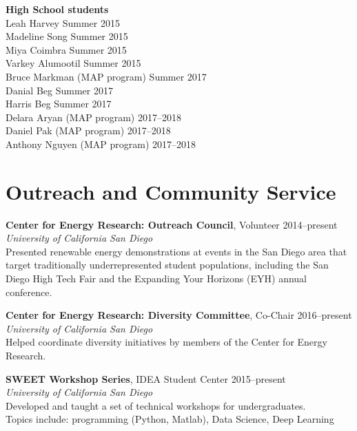 \documentclass[10pt]{res}
\begin{document}
\begin{resume}
\textbf{High School students} \\
Leah Harvey \hfill Summer 2015 \\
Madeline Song \hfill Summer 2015 \\
Miya Coimbra \hfill Summer 2015 \\
Varkey Alumootil \hfill Summer 2015 \\
Bruce Markman (MAP program) \hfill Summer 2017 \\
Danial Beg \hfill Summer 2017 \\
Harris Beg \hfill Summer 2017 \\
Delara Aryan (MAP program) \hfill 2017--2018 \\
Daniel Pak (MAP program) \hfill 2017--2018 \\
Anthony Nguyen (MAP program) \hfill 2017--2018



\section{Outreach and Community Service}
\vspace{0.1in}
%

\textbf{Center for Energy Research: Outreach Council}, Volunteer \hfill 2014--present \\
\textit{University of California San Diego} \\
Presented renewable energy demonstrations at events in the San Diego area that
target traditionally underrepresented student populations, including the San Diego
High Tech Fair and the Expanding Your Horizons (EYH) annual conference.

\textbf{Center for Energy Research: Diversity Committee}, Co-Chair \hfill 2016--present \\
\textit{University of California San Diego} \\
Helped coordinate diversity initiatives by members of the Center for Energy Research.

\textbf{SWEET Workshop Series}, IDEA Student Center \hfill 2015--present \\
\textit{University of California San Diego} \\
Developed and taught a set of technical workshops for undergraduates. \\
Topics include: programming (Python, Matlab), Data Science, Deep Learning


\end{resume}
\end{document}
